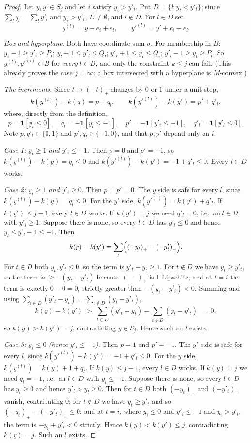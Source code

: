 \documentclass[11pt]{article}
\theoremstyle{plain}
\theoremstyle{definition}
\newcommand{\pospart}[1]{\left(#1\right)_{+}}
\begin{document}
\begin{proof}
Let $y,y'\in S_j$ and let $i$ satisfy $y_i>y'_i$. Put $D=\{l:y_l<y'_l\}$; since
$\sum_l y_l=\sum_l y'_l$ and $y_i>y'_i$, $D\ne\emptyset$, and $i\notin D$. For $l\in D$ set
\[
  y^{(l)}=y-e_i+e_l,\qquad y'^{(l)}=y'+e_i-e_l .
\]

\emph{Box and hyperplane.} Both have coordinate sum $\sigma$. For membership in $B$:
$y_i-1\ge y'_i\ge P_i$; $y_l+1\le y'_l\le Q_l$; $y'_i+1\le y_i\le Q_i$;
$y'_l-1\ge y_l\ge P_l$. So $y^{(l)},y'^{(l)}\in B$ for \emph{every} $l\in D$, and only the
constraint $k\le j$ can fail. (This already proves the case $j=\infty$: a box intersected
with a hyperplane is $M$-convex.)

\emph{The increments.} Since $t\mapsto\pospart{-t}$ changes by $0$ or $1$ under a unit
step,
\[
  k(y^{(l)})-k(y)=p+q_l,\qquad k(y'^{(l)})-k(y')=p'+q'_l,
\]
where, directly from the definition,
\[
  p=\mathbf 1[y_i\le 0],\quad q_l=-\mathbf 1[y_l\le-1],\quad
  p'=-\mathbf 1[y'_i\le-1],\quad q'_l=\mathbf 1[y'_l\le 0].
\]
Note $p,q'_l\in\{0,1\}$ and $p',q_l\in\{-1,0\}$, and that $p,p'$ depend only on $i$.

\emph{Case 1: $y_i\ge1$ and $y'_i\le-1$.} Then $p=0$ and $p'=-1$, so
$k(y^{(l)})-k(y)=q_l\le0$ and $k(y'^{(l)})-k(y')=-1+q'_l\le0$. Every $l\in D$ works.

\emph{Case 2: $y_i\ge1$ and $y'_i\ge0$.} Then $p=p'=0$. The $y$ side is safe for every
$l$, since $k(y^{(l)})-k(y)=q_l\le0$. For the $y'$ side, $k(y'^{(l)})=k(y')+q'_l$. If
$k(y')\le j-1$, every $l\in D$ works. If $k(y')=j$ we need $q'_l=0$, i.e.\ an $l\in D$
with $y'_l\ge1$. Suppose there is none, so every $l\in D$ has $y'_l\le0$ and hence
$y_l\le y'_l-1\le-1$. Then
\[
   k(y)-k(y')=\sum_t\Bigl(\pospart{-y_t}-\pospart{-y'_t}\Bigr).
\]
For $t\in D$ both $y_t,y'_t\le0$, so the term is $y'_t-y_t\ge1$. For $t\notin D$ we have
$y_t\ge y'_t$, so the term is $\ge-(y_t-y'_t)$ because $\pospart{-\cdot}$ is
$1$-Lipschitz; and at $t=i$ the term is exactly $0-0=0$, strictly greater than
$-(y_i-y'_i)<0$. Summing and using
$\sum_{t\in D}(y'_t-y_t)=\sum_{t\notin D}(y_t-y'_t)$,
\[
   k(y)-k(y')\;>\;\sum_{t\in D}(y'_t-y_t)-\sum_{t\notin D}(y_t-y'_t)\;=\;0,
\]
so $k(y)>k(y')=j$, contradicting $y\in S_j$. Hence such an $l$ exists.

\emph{Case 3: $y_i\le0$ (hence $y'_i\le-1$).} Then $p=1$ and $p'=-1$. The $y'$ side is
safe for every $l$, since $k(y'^{(l)})-k(y')=-1+q'_l\le0$. For the $y$ side,
$k(y^{(l)})=k(y)+1+q_l$. If $k(y)\le j-1$, every $l\in D$ works. If $k(y)=j$ we need
$q_l=-1$, i.e.\ an $l\in D$ with $y_l\le-1$. Suppose there is none, so every $l\in D$ has
$y_l\ge0$ and hence $y'_l>y_l\ge0$. Then for $t\in D$ both $\pospart{-y_t}$ and
$\pospart{-y'_t}$ vanish, contributing $0$; for $t\notin D$ we have $y_t\ge y'_t$ and so
$\pospart{-y_t}-\pospart{-y'_t}\le0$; and at $t=i$, where $y_i\le0$ and $y'_i\le-1$ and
$y_i>y'_i$, the term is $-y_i+y'_i<0$ strictly. Hence $k(y)<k(y')\le j$, contradicting
$k(y)=j$. Such an $l$ exists.


\end{proof}
\end{document}
